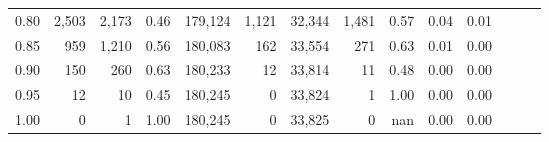 \begin{tabular}{rrrrrrrrrrrrrr}
0.80 &   2,503 &  2,173 &  0.46 &  179,124 &    1,121 &  32,344 &   1,481 &  0.57 &  0.04 &      0.01 \\
0.85 &     959 &  1,210 &  0.56 &  180,083 &      162 &  33,554 &     271 &  0.63 &  0.01 &      0.00 \\
0.90 &     150 &    260 &  0.63 &  180,233 &       12 &  33,814 &      11 &  0.48 &  0.00 &      0.00 \\
0.95 &      12 &     10 &  0.45 &  180,245 &        0 &  33,824 &       1 &  1.00 &  0.00 &      0.00 \\
1.00 &       0 &      1 &  1.00 &  180,245 &        0 &  33,825 &       0 &   nan &  0.00 &      0.00 \\
\bottomrule
\end{tabular}
